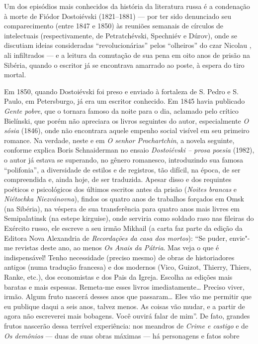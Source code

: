 Um dos episódios mais conhecidos da história da literatura russa é a
condenação à morte de Fiódor Dostoiévski (1821--1881) --- por ter sido
denunciado seu comparecimento (entre 1847 e 1850) às reuniões semanais
de círculos de intelectuais (respectivamente, de Petratchévski,
Spechniév e Dúrov), onde se discutiam ideias consideradas
``revolucionárias'' pelos ``olheiros'' do czar Nicolau , ali
infiltrados --- e a leitura da comutação de sua pena em oito anos de
prisão na Sibéria, quando o escritor já se encontrava amarrado ao poste,
à espera do tiro mortal.

Em 1850, quando Dostoiévski foi preso e enviado à fortaleza de S. Pedro
e S. Paulo, em Petersburgo, já era um escritor conhecido. Em 1845 havia
publicado \emph{Gente pobre}, que o tornara famoso da noite para o dia,
aclamado pelo crítico Bielínski, que porém não apreciara os livros
seguintes do autor, especialmente \emph{O sósia} (1846), onde não
encontrara aquele empenho social visível em seu primeiro romance. Na
verdade, neste e em \emph{O senhor Prochartchin}, a novela seguinte,
conforme explica Boris Schnaiderman no ensaio \emph{Dostoiévski -- prosa
poesia} (1982), o autor já estava se superando, no gênero romanesco,
introduzindo sua famosa ``polifonia'', a diversidade de estilos e de
registros, tão difícil, na época, de ser compreendida e, ainda hoje, de
ser traduzida. Apesar disso e dos requintes poéticos e psicológicos dos
últimos escritos antes da prisão (\emph{Noites brancas} e \emph{Niétochka
Niezvánovna}), findos os quatro anos de trabalhos forçados em Omsk (na
Sibéria), na véspera de sua transferência para quatro anos mais livres
em Semipalatinsk (na estepe kirguise), onde serviria como soldado raso
nas fileiras do Exército russo, ele escreve a seu irmão Mikhail (a carta
faz parte da edição da Editora Nova Alexandria de \emph{Recordações da
casa dos mortos}): ``Se puder, envie"-me revistas deste ano, ao menos
\emph{Os Anais da Pátria}. Mas veja o que é indispensável! Tenho
necessidade (preciso mesmo) de obras de historiadores antigos (numa
tradução francesa) e dos modernos (Vico, Guizot, Thierry, Thiers, Ranke,
etc.), dos economistas e dos Pais da Igreja. Escolha as edições mais
baratas e mais espessas. Remeta-me esses livros imediatamente\ldots{} Preciso
viver, irmão. Algum fruto nascerá desses anos que passaram\ldots{} Eles vão
me permitir que eu publique daqui a seis anos, talvez menos. As coisas
vão mudar, e a partir de agora não escreverei mais bobagens. Você ouvirá
falar de mim''. De fato, grandes frutos nascerão dessa terrível
experiência: nos meandros de \emph{Crime e castigo} e de \emph{Os
demônios} --- duas de suas obras máximas --- há personagens e fatos sobre
